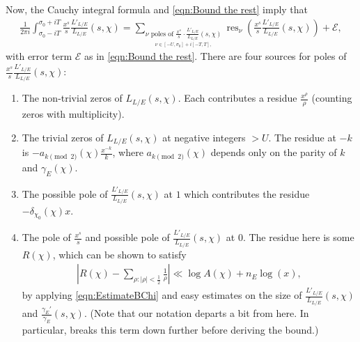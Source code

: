 \documentclass[12pt]{amsart}
\theoremstyle{definition}
\theoremstyle{remark}
\numberwithin{equation}{section}
\newcommand{\cE}{\mathcal E}
\DeclareMathOperator{\residue}{res}
\begin{document}
Now, the Cauchy integral formula and \eqref{eqn:Bound the rest} imply that 
\begin{align}
 \frac{1}{2\pi i} \int_{\sigma_{0} - iT}^{\sigma_{0} + iT} \frac{x^{s}}{s} \frac{L'_{L/E}}{L_{L/E}}(s,\chi) =\sum_{\underset{\nu \in [-U, \sigma_{0}] + i[-T, T],}{\nu \text{ poles of }\frac{x^{s}}{s} \cdot \frac{L'_{L/E}}{L_{L/E}}(s,\chi)}} \residue_{\nu}\left(\frac{x^{s}}{s} \frac{L'_{L/E}}{L_{L/E}}(s,\chi)\right) + \cE,
\end{align}
with error term $\cE$ as in \eqref{eqn:Bound the rest}. There are four sources for poles of $\frac{x^{s}}{s} \frac{L'_{L/E}}{L_{L/E}}(s,\chi)$: 
\begin{enumerate}
\item The non-trivial zeros of $L_{L/E}(s,\chi)$. Each contributes a residue $\frac{x^{\rho}}{\rho}$ (counting zeros with multiplicity).
\item The trivial zeros of $L_{L/E}(s,\chi)$ at negative integers $ > U$. The residue at $-k$ is $-a_{k \pmod{2}}(\chi)\frac{x^{-k}}{k}$, where $a_{k \pmod{2}}(\chi)$ depends only on the parity of $k$ and $\gamma_{E}(\chi)$.
\item The possible pole of $\frac{L'_{L/E}}{L_{L/E}}(s,\chi)$ at $1$ which contributes the residue $- \delta_{\chi_{0}}(\chi)x$.
\item The pole of $\frac{x^{s}}{s}$ and possible pole of $\frac{L'_{L/E}}{L_{L/E}}(s,\chi)$ at $0$. The residue here is some $R(\chi)$,  which can be shown to satisfy
\begin{align}
\left|R(\chi) - \sum_{\rho: |\rho| < \frac{1}{2}}\frac{1}{\rho} \right| \ll \log A(\chi) + n_{E} \log(x),
\end{align}
by applying \eqref{eqn:EstimateBChi} and easy estimates on the size of $\frac{L'_{L/E}}{L_{L/E}}(s,\chi)$ and $\frac{\gamma_{E}'}{\gamma_{E}}(s,\chi)$. (Note that our notation departs a bit from \cite{LagariasOdlyzko77} here. In particular, \cite{LagariasOdlyzko77} breaks this term down further before deriving the bound.)
\end{enumerate}
\end{document}
